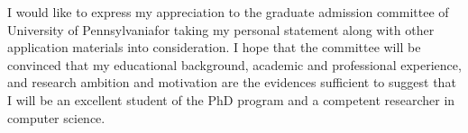 \documentclass[a4paper,10pt]{report}
\newcommand{\university}{University of Pennsylvania}
\begin{document}
\vspace{0.2cm}
I would like to express my appreciation to the graduate admission committee of \university \space for taking my personal statement along with other application materials into consideration. I hope that the committee will be convinced that my educational background, academic and professional experience, and research ambition and motivation are the evidences sufficient to suggest that I will be an excellent student of the PhD program and a competent researcher in computer science.
\end{document}
